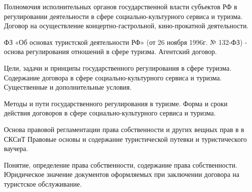 \documentclass[
	14pt,
	a4paper,
	]
	{scrartcl}
\begin{document}
\vfill

\newpage


\shapk
{}
\setcounter{zad}{0}

\vfill
\z Полномочия исполнительных органов государственной власти субъектов РФ в регулировании деятельности в сфере социально-культурного сервиса и туризма.
 \vfill
\z Договор на осуществление концертно-гастрольной, кино-прокатной деятельности.
 \vfill

\vfill

\newpage


\shapk
{}
\setcounter{zad}{0}

\vfill
\z ФЗ «Об основах туристской деятельности РФ» (от 26 ноября 1996г. № 132-ФЗ) - основа регулирования отношений в сфере туризма.
 \vfill
\z Агентский договор.
 \vfill

\vfill

\newpage


\shapk
{}
\setcounter{zad}{0}

\vfill
\z Цели, задачи и принципы государственного регулирования в сфере туризма.
 \vfill
\z Содержание договора в сфере социально-культурного сервиса и туризма. Существенные и дополнительные условия.
 \vfill

\vfill

\newpage


\shapk
{}
\setcounter{zad}{0}

\vfill
\z Методы и пути государственного регулирования в туризме.
 \vfill
\z Форма и сроки действия договоров в сфере социально-культурного сервиса и туризма.
 \vfill

\vfill

\newpage


\shapk
{}
\setcounter{zad}{0}

\vfill
\z Основа  правовой регламентации права собственности и других вещных прав в  в СКСиТ
 \vfill
\z Правовые основы и содержание туристической путевки и туристического ваучера.
 \vfill

\vfill

\newpage


\shapk
{}
\setcounter{zad}{0}

\vfill
\z Понятие, определение права собственности,  содержание права собственности.
 \vfill
\z Юридическое значение документов оформляемых при заключении договора на туристское обслуживание.
 \vfill
\end{document}
